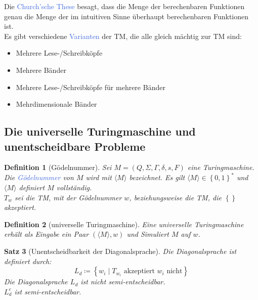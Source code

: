 \documentclass[11pt]{scrartcl}
\newcommand{\tcol}[1]{\textcolor{RoyalBlue}{#1}}
\newcommand{\set}[1]{\left\lbrace #1\right\rbrace}
\theoremstyle{break}
\newtheorem{satz}{Satz}[section]
\newtheorem{defi}[satz]{Definition}
\begin{document}
    Die \tcol{Church'sche These} besagt, dass die Menge der berechenbaren Funktionen genau die Menge der im intuitiven Sinne überhaupt berechenbaren Funktionen ist.\\

    Es gibt verschiedene \tcol{Varianten} der TM, die alle gleich mächtig zur TM sind:
    \begin{itemize}
        \item Mehrere Lese-/Schreibköpfe
        \item Mehrere Bänder
        \item Mehrere Lese-/Schreibköpfe für mehrere Bänder
        \item Mehrdimensionale Bänder
    \end{itemize}


    \subsection{Die universelle Turingmaschine und unentscheidbare Probleme}
	\label{subsec:die-universelle-turingmaschineindexund-unentscheidbare-problemeindex}

    \begin{defi}[Gödelnummer]
        Sei $M=(Q,\Sigma,\Gamma,\delta,s,F)$ eine Turingmaschine.
        Die \tcol{Gödelnummer} von $M$ wird mit $\langle M\rangle$ bezeichnet.
        Es gilt $\langle M\rangle\in\set{0,1}^*$ und $\langle M\rangle$ definiert $M$ vollständig.\\
        $T_w$ sei die TM, mit der Gödelnummer $w$, beziehungsweise die TM, die $\set{}$ akzeptiert.
    \end{defi}

    \begin{defi}[universelle Turingmaschine]
        Eine universelle Turingmaschine erhält als Eingabe ein Paar $(\langle M\rangle,w)$ und Simuliert $M$ auf $w$.
    \end{defi}

    \begin{satz}[Unentscheidbarkeit der Diagonalsprache]
        Die Diagonalsprache ist definiert durch:
        \[L_d\coloneqq\set{w_i\mid T_{w_i}\text{ akzeptiert }w_i\text{ nicht}}\]
        Die Diagonalsprache $L_d$ ist nicht semi-entscheidbar.\\
        $L_d^c$ ist semi-entscheidbar.
    \end{satz}
\end{document}
